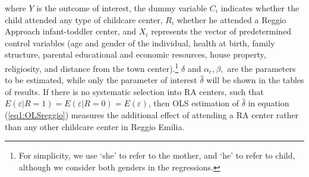\documentclass[12pt]{article}
\begin{document}
where $Y$ is the outcome of interest, the dummy variable $C_{i}$ indicates whether the child attended any type of childcare center, $R_{i}$ whether he attended a Reggio Approach infant-toddler center, and $X_{i}$ represents the vector of predetermined control variables (age and gender of the individual, health at birth, family structure, parental educational and economic resources, house property, religiosity, and distance from the town center).\footnote{For simplicity, we use `she' to refer to the mother, and `he' to refer to child, although we consider both genders in the regressions.} $\delta$ and $\alpha_{c}, \beta,$ are the parameters to be estimated, while only the parameter of interest $\hat{\delta}$ will be shown in the tables of results. If there is no systematic selection into RA centers, such that $E(\varepsilon|R=1)=E(\varepsilon|R=0)=E(\varepsilon)$, then OLS estimation of $\hat{\delta}$ in equation (\ref{eq1:OLSreggio}) measures the additional effect of attending a RA center rather than any other childcare center in Reggio Emilia.

%
%
%
%
%
%
\end{document}
